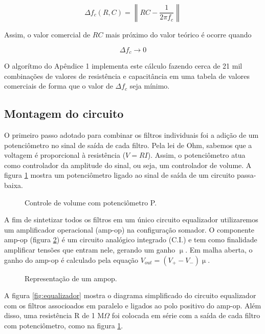 \documentclass{article}
\begin{document}
$$
  \Delta f_c(R, C) = \left\|RC - \frac{1}{2\pi f_c}\right\|
$$

Assim, o valor comercial de $RC$ mais próximo do valor teórico é ocorre quando

$$
  \Delta f_c \rightarrow 0
$$

O algorítmo do Apêndice 1 implementa este cálculo fazendo cerca de 21 mil combinações  de valores de resistência e capacitância em uma tabela de valores comerciais \cite{tabela-comercial} de forma que o valor de $\Delta f_c$ seja mínimo.

\subsection{Montagem do circuito}

O primeiro passo adotado para combinar os filtros individuais foi a adição de um potenciômetro no sinal de saída de cada filtro. Pela lei de Ohm, sabemos que a voltagem é proporcional à resistência ($V = RI$). Assim, o potenciômetro atua como controlador da amplitude do sinal, ou seja, um controlador de volume. A figura \ref{fig:teo-potenciometro} mostra um potenciômetro ligado ao sinal de saída de um circuito passa-baixa. \cite{equalizador}

\begin{figure}[ht!]
  \centering
  
  \caption{Controle de volume com potenciômetro P.}
  \label{fig:teo-potenciometro}
\end{figure}

A fim de sintetizar todos os filtros em um único circuito equalizador utilizaremos um amplificador operacional (amp-op) na configuração somador. O componente amp-op (figura \ref{fig:ampop}) é um circuito analógico integrado (C.I.) e tem como finalidade amplificar tensões que entram nele, gerando um ganho $\upmu$. Em malha aberta, o ganho do amp-op é calculado pela equação $V_{out} = (V_+ - V_-)\upmu$.

\begin{figure}[ht!]
  \centering
  
  \caption{Representação de um ampop.}
  \label{fig:ampop}
\end{figure}

A figura \ref{fig:equalizador} mostra o diagrama simplificado do circuito equalizador com os filtros associoados em paralelo e ligados ao polo positivo do amp-op. Além disso, uma resistência R de 1 M$\Omega$ foi colocada em série com a saída de cada filtro com potenciômetro, como na figura \ref{fig:teo-potenciometro}.
\end{document}
